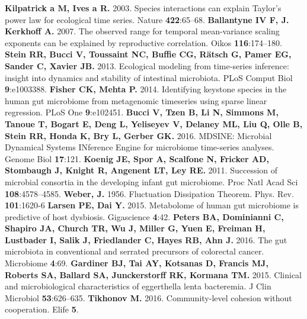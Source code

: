 \documentclass[12pt,oneside,letterpaper]{article}
\begin{document}
\begin{thebibliography}{99}
 {\bf Kilpatrick a M, Ives a R.} 2003. Species interactions can explain Taylor’s power law for ecological time series. Nature {\bf 422}:65–68.
 {\bf Ballantyne IV F, J. Kerkhoff A.} 2007. The observed range for temporal mean-variance scaling exponents can be explained by reproductive correlation. Oikos {\bf 116}:174–180.
 {\bf Stein RR, Bucci V, Toussaint NC, Buffie CG, Rätsch G, Pamer EG, Sander C, Xavier JB.}  2013. Ecological modeling from time-series inference: insight into dynamics and stability of intestinal microbiota. PLoS Comput Biol {\bf 9}:e1003388.
 {\bf Fisher CK, Mehta P.} 2014. Identifying keystone species in the human gut microbiome from metagenomic timeseries using sparse linear regression. PLoS One {\bf 9}:e102451.
  {\bf Bucci V, Tzen B, Li N, Simmons M, Tanoue T, Bogart E, Deng L, Yeliseyev V, Delaney ML, Liu Q, Olle B, Stein RR, Honda K, Bry L, Gerber GK.} 2016. MDSINE: Microbial Dynamical Systems INference Engine for microbiome time-series analyses. Genome Biol {\bf 17}:121.
 {\bf Koenig JE, Spor A, Scalfone N, Fricker AD, Stombaugh J, Knight R, Angenent LT, Ley RE.} 2011. Succession of microbial consortia in the developing infant gut microbiome. Proc Natl Acad Sci {\bf 108}:4578–4585.
 {\bf Weber, J.} 1956. Fluctuation Dissipation Theorem. Phys. Rev. {\bf 101}:1620-6
 {\bf Larsen PE, Dai Y.} 2015. Metabolome of human gut microbiome is predictive of host dysbiosis. Gigascience {\bf 4}:42.
 {\bf Peters BA, Dominianni C, Shapiro JA, Church TR, Wu J, Miller G, Yuen E, Freiman H, Lustbader I, Salik J, Friedlander C, Hayes RB, Ahn J.} 2016. The gut microbiota in conventional and serrated precursors of colorectal cancer. Microbiome {\bf 4}:69.
 {\bf Gardiner BJ, Tai AY, Kotsanas D, Francis MJ, Roberts SA, Ballard SA, Junckerstorff RK, Kormana TM.} 2015. Clinical and microbiological characteristics of eggerthella lenta bacteremia. J Clin Microbiol {\bf 53}:626–635.
 {\bf  Tikhonov M.} 2016. Community-level cohesion without cooperation. Elife {\bf 5}. 


\end{thebibliography}
\end{document}

